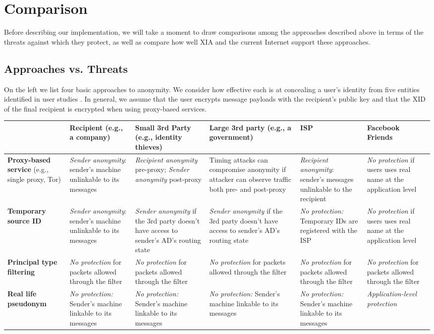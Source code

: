 \documentclass{article}
\begin{document}
\section{Comparison}
\label{comparison}
Before describing our implementation, we will take a moment to draw comparisons among the approaches described above in terms of the threats against which they protect, as well as compare how well XIA and the current Internet support these approaches.

\subsection{Approaches vs. Threats}
On the left we list four basic approaches to anonymity. We consider how effective each is at concealing a user's identity from five entities identified in user studies \cite{user-study}. In general, we assume that the user encrypts message payloads with the recipient's public key and that the XID of the final recipient is encrypted when using proxy-based services.

\begin{center}
	\begin{tabular}{p{2cm} || p{2.5cm} | p{2.5cm} | p{2.5cm} | p{2.5cm} | p{2.5cm}}
	& \textbf{Recipient} (e.g., a company) &	\textbf{Small 3rd Party} (e.g., identity thieves) & \textbf{Large 3rd party} (e.g., a government) & \textbf{ISP} & \textbf{Facebook Friends}\\
	\hline
	\hline
	{\bf Proxy-based service} (e.g., single proxy, Tor)&{\em Sender anonymity}: sender's machine unlinkable to its messages&{\em Recipient anonymity} pre-proxy; {\em Sender anonymity} post-proxy&Timing attacks can compromise anonymity if attacker can observe traffic both pre- and post-proxy&{\em Recipient anonymity}: sender's messages unlinkable to the recipient&{\em No protection} if users uses real name at the application level\\
	\hline
	{\bf Temporary source ID} &{\em Sender anonymity}: sender's machine unlinkable to its messages&{\em Sender anonymity} if the 3rd party doesn't have access to sender's AD's routing state&{\em Sender anonymity} if the 3rd party doesn't have access to sender's AD's routing state&{\em No protection:} Temporary IDs are registered with the ISP&{\em No protection} if users uses real name at the application level\\
	\hline
	{\bf Principal type filtering} &{\em No protection} for packets allowed through the filter&{\em No protection} for packets allowed through the filter&{\em No protection} for packets allowed through the filter&{\em No protection} for packets allowed through the filter&{\em No protection} for packets allowed through the filter\\
	\hline
	{\bf Real life pseudonym} &{\em No protection:} Sender's machine linkable to its messages&{\em No protection:} Sender's machine linkable to its messages&{\em No protection:} Sender's machine linkable to its messages&{\em No protection:} Sender's machine linkable to its messages&{\em Application-level protection}\\
	\hline
	\end{tabular}
\end{center}
\end{document}

